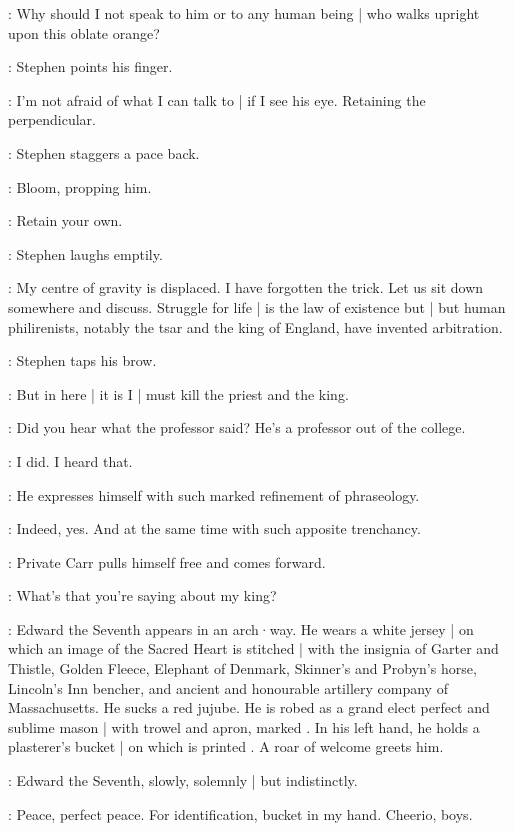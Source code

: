 \Stephen:
Why should I not speak to him or to any human being |
who walks upright upon this oblate orange?

:
Stephen points his finger.

\Stephen:
I'm not afraid of what I can talk to |
if I see his eye.
Retaining the perpendicular.

:
Stephen staggers a pace back.

:
Bloom,
propping him.

\Bloom:
Retain your own.

:
Stephen laughs emptily.

\Stephen:
My centre of gravity is displaced.
I have forgotten the trick.
Let us sit down somewhere and discuss.
Struggle for life |
is the law of existence but |
but human philirenists,
notably the tsar and the king of England,
have invented arbitration.

:
Stephen taps his brow.

\Stephen:
But in here |
it is I |
must kill the priest and the king.

\BiddyClap[2]:
Did you hear what the professor said?
He's a professor out of the college.

\CuntyKate[2]:
I did.
I heard that.

\BiddyClap[2]:
He expresses himself with such marked refinement of phraseology.

\CuntyKate[2]:
Indeed,
yes.
And at the same time with such apposite trenchancy.

:
Private Carr pulls himself free and comes forward.

\Carr:
What's that you're saying about my king?

:
Edward the Seventh appears in an arch·way.
He wears a white jersey |
on which an image of the Sacred Heart
%
is stitched |
with the insignia of Garter and Thistle,
Golden Fleece,
Elephant of Denmark,
Skinner's and Probyn's horse,
Lincoln's Inn bencher,
and ancient and honourable artillery company of Massachusetts.
He sucks a red jujube.
He is robed as a grand elect perfect and sublime mason |
with trowel and apron,
marked .
In his left hand,
he holds a plasterer's bucket |
on which is printed .
A roar of welcome greets him.

:
Edward the Seventh,
slowly,
solemnly |
but indistinctly.

\EdwardSeventh:
Peace,
perfect peace.
For identification,
bucket in my hand.
%
Cheerio,
boys.

